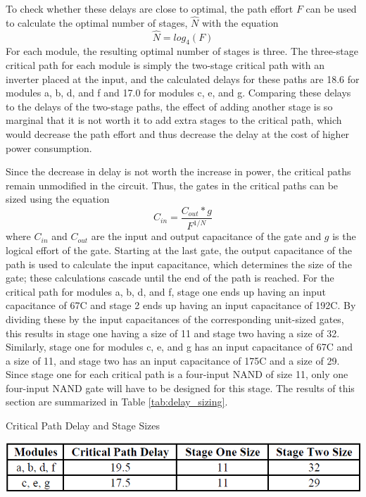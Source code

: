 \documentclass[12pt]{article}
\begin{document}
To check whether these delays are close to optimal, the path effort \(F\) can be used to calculate the optimal number of stages, \(\hat{N}\) with the equation
\begin{equation}
	\hat{N} = log_4(F)
\end{equation}
For each module, the resulting optimal number of stages is three.
The three-stage critical path for each module is simply the two-stage critical path with an inverter placed at the input, and the calculated delays for these paths are 18.6 for modules a, b, d, and f and 17.0 for modules c, e, and g. 
Comparing these delays to the delays of the two-stage paths, the effect of adding another stage is so marginal that it is not worth it to add extra stages to the critical path, which would decrease the path effort and thus decrease the delay at the cost of higher power consumption.

Since the decrease in delay is not worth the increase in power, the critical paths remain unmodified in the circuit.
Thus, the gates in the critical paths can be sized using the equation
\begin{equation}
	C_{in} = \frac{C_{out}*g}{F^{1/N}}
\end{equation}
where \(C_{in}\) and \(C_{out}\) are the input and output capacitance of the gate and \(g\) is the logical effort of the gate.
Starting at the last gate, the output capacitance of the path is used to calculate the input capacitance, which determines the size of the gate; these calculations cascade until the end of the path is reached.
For the critical path for modules a, b, d, and f, stage one ends up having an input capacitance of 67C and stage 2 ends up having an input capacitance of 192C. 
By dividing these by the input capacitances of the corresponding unit-sized gates, this results in stage one having a size of 11 and stage two having a size of 32.
Similarly, stage one for modules c, e, and g has an input capacitance of 67C and a size of 11, and stage two has an input capacitance of 175C and a size of 29.
Since stage one for each critical path is a four-input NAND of size 11, only one four-input NAND gate will have to be designed for this stage.
The results of this section are summarized in Table \ref{tab:delay_sizing}.

\begin{table}[H]
	\centering
	\caption{Critical Path Delay and Stage Sizes}
	\label{tab:delay_sizing}
	\includegraphics[width=0.75\linewidth, keepaspectratio]{DelaySizeTable}
\end{table}
\end{document}
